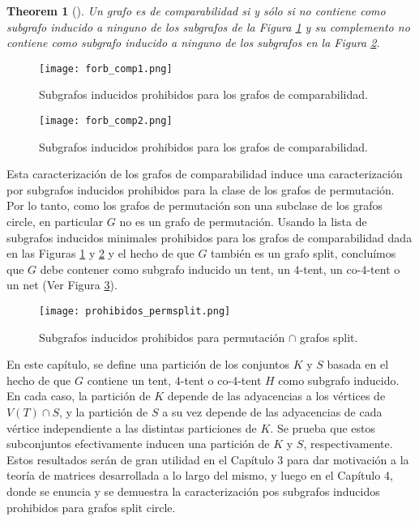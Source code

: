 \documentclass[12pt]{book}
\theoremstyle{plain}
\newtheorem{teo}{Theorem}[chapter]
\theoremstyle{remark}
\begin{document}
\begin{teo}[\cite{G67}]
Un grafo es de comparabilidad si y sólo si no contiene como subgrafo inducido a ninguno de los subgrafos de la Figura \ref{fig:forb_comparability1_} y su complemento no contiene como subgrafo inducido a ninguno de los subgrafos en la Figura \ref{fig:forb_comparability2_}.
\end{teo}

\begin{figure}[h]
\centering
\texttt{[image: forb\_comp1.png]}
\caption{Subgrafos inducidos prohibidos para los grafos de comparabilidad.} \label{fig:forb_comparability1_}
\end{figure} 

\begin{figure}[h]
\centering
\texttt{[image: forb\_comp2.png]}
\caption{Subgrafos inducidos prohibidos para los grafos de comparabilidad.} \label{fig:forb_comparability2_}
\end{figure} 

Esta caracterización de los grafos de comparabilidad induce una caracterización por subgrafos inducidos prohibidos para la clase de los grafos de permutación.
Por lo tanto, como los grafos de permutación son una subclase de los grafos circle, en particular $G$ no es un grafo de permutación. Usando la lista de subgrafos inducidos minimales prohibidos para los grafos de comparabilidad dada en las Figuras \ref{fig:forb_comparability1_} y \ref{fig:forb_comparability2_}  y el hecho de que $G$ también es un grafo split, concluímos que $G$ debe contener como subgrafo inducido un tent, un $4$-tent, un co-$4$-tent o un net (Ver Figura \ref{fig:forb_permsplit_base_}).

\begin{figure}[h]
\centering
\texttt{[image: prohibidos\_permsplit.png]}
\caption{Subgrafos inducidos prohibidos para permutación $\cap$ grafos split.%
} \label{fig:forb_permsplit_base_}
\end{figure} 

En este capítulo, se define una partición de los conjuntos $K$ y $S$ basada en el hecho de que $G$ contiene un tent, $4$-tent o co-$4$-tent $H$ como subgrafo inducido. En cada caso, la partición de $K$ depende de las adyacencias a los vértices de $V(T) \cap S$, y la partición de $S$ a su vez depende de las adyacencias de cada vértice independiente a las distintas particiones de $K$.
Se prueba que estos subconjuntos efectivamente inducen una partición de $K$ y $S$, respectivamente. 
Estos resultados serán de gran utilidad en el Capítulo 3 para dar motivación a la teoría de matrices desarrollada a lo largo del mismo, y luego en el Capítulo 4, donde se enuncia y se demuestra la caracterización pos subgrafos inducidos prohibidos para grafos split circle.
\end{document}
